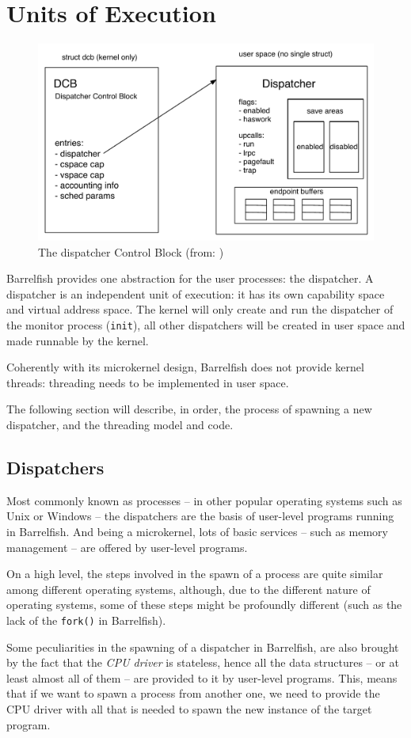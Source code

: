 \documentclass[a4paper,twoside,openright]{report}
\begin{document}
\chapter{Units of Execution}
\begin{figure}
	\centering
	\includegraphics[width=0.7\linewidth]{assets/dcb}
	\caption{The dispatcher Control Block (from: \cite{barrelfishdoc})}
	\label{fig:dcb}
\end{figure}

Barrelfish provides one abstraction for the user processes: the dispatcher. A dispatcher is an independent unit of execution: it has its own capability space and virtual address space. The kernel will only create and run the dispatcher of the monitor process (\texttt{init}), all other dispatchers will be created in user space and made runnable by the kernel.

Coherently with its microkernel design, Barrelfish does not provide kernel threads: threading needs to be implemented in user space.

The following section will describe, in order, the process of spawning a new dispatcher, and the threading model and code.
\section{Dispatchers}
\label{sec:dispatchers}
Most commonly known as processes -- in other popular operating systems such as Unix or Windows -- the dispatchers are the basis of user-level programs running in Barrelfish.
And being a microkernel, lots of basic services -- such as memory management -- are offered by user-level programs.

On a high level, the steps involved in the spawn of a process are quite similar among different operating systems, although, due to the different nature of operating systems, some of these steps might be profoundly different (such as the lack of the \texttt{fork()} in Barrelfish).

Some peculiarities in the spawning of a dispatcher in Barrelfish, are also brought by the fact that the \emph{CPU driver} is stateless, hence all the data structures -- or at least almost all of them -- are provided to it by user-level programs.
This, means that if we want to spawn a process from another one, we need to provide the CPU driver with all that is needed to spawn the new instance of the target program.
\end{document}
